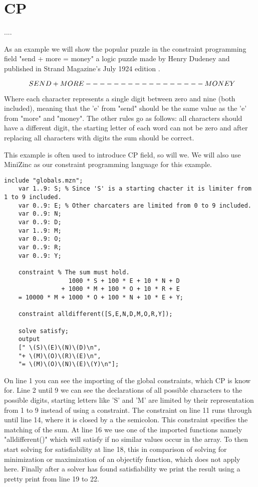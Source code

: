 \section{CP}
\label{CS:CP}
....


As an example we will show the popular puzzle in the constraint programming field "send + more = money" a logic puzzle made by Henry Dudeney and published in Strand Magazine's July 1924 edition \cite{sendMoreMoney}.
\begin{center}
	\[$$
	\; \; S E N D\\
	+ M O R E\\
	-----------------\\
	M O N E Y
	$$\]
\end{center}
Where each character represents a single digit between zero and nine (both included), meaning that the 'e' from "send" should be the same value as the 'e' from "more" and "money". The other rules go as follows: all characters should have a different digit, the starting letter of each word can not be zero and after replacing all characters with digits the sum should be correct. 

This example is often used to introduce CP field, so will we. We will also use MiniZinc as our constraint programming language for this example.

\label{lst:SendMoreMoney}
\begin{lstlisting}[language=minizinc, caption={Solution to "send + more = money" slightly modified from \url{https://www.minizinc.org/doc-2.5.5/en/downloads/send-more-money.mzn}}]
	include "globals.mzn";
	var 1..9: S; % Since 'S' is a starting chacter it is limiter from 1 to 9 included.
	var 0..9: E; % Other charcaters are limited from 0 to 9 included.
	var 0..9: N;
	var 0..9: D;
	var 1..9: M;
	var 0..9: O;
	var 0..9: R;
	var 0..9: Y;
	
	constraint % The sum must hold.
	              1000 * S + 100 * E + 10 * N + D
	            + 1000 * M + 100 * O + 10 * R + E
	= 10000 * M + 1000 * O + 100 * N + 10 * E + Y;
	
	constraint alldifferent([S,E,N,D,M,O,R,Y]);
	
	solve satisfy;
	output 
	[" \(S)\(E)\(N)\(D)\n",
	"+ \(M)\(O)\(R)\(E)\n",
	"= \(M)\(O)\(N)\(E)\(Y)\n"];
\end{lstlisting}
\label{sendMoreMoneyExplanation}
On line 1 you can see the importing of the global constraints, which CP is know for. Line 2 until 9 we can see the declarations of all possible characters to the possible digits, starting letters like 'S' and 'M' are limited by their representation from 1 to 9 instead of using a constraint. The constraint on line 11 runs through until line 14, where it is closed by a the semicolon. This constraint specifies the matching of the sum. At line 16 we use one of the imported functions namely "alldifferent()" which will satisfy if no similar values occur in the array. To then start solving for satisfiability at line 18, this in comparison of solving for minimization or maximization of an objectify function, which does not apply here. Finally after a solver has found satisfiability we print the result using a pretty print from line 19 to 22.

